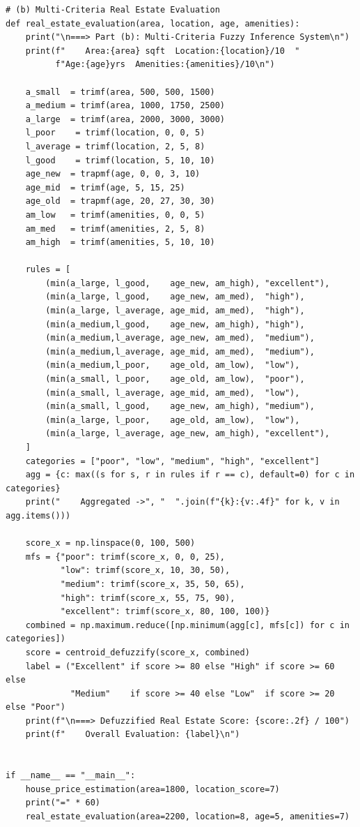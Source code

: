 \documentclass[12pt,a4paper]{article}
\begin{document}
\begin{lstlisting}
# (b) Multi-Criteria Real Estate Evaluation
def real_estate_evaluation(area, location, age, amenities):
    print("\n===> Part (b): Multi-Criteria Fuzzy Inference System\n")
    print(f"    Area:{area} sqft  Location:{location}/10  "
          f"Age:{age}yrs  Amenities:{amenities}/10\n")

    a_small  = trimf(area, 500, 500, 1500)
    a_medium = trimf(area, 1000, 1750, 2500)
    a_large  = trimf(area, 2000, 3000, 3000)
    l_poor    = trimf(location, 0, 0, 5)
    l_average = trimf(location, 2, 5, 8)
    l_good    = trimf(location, 5, 10, 10)
    age_new  = trapmf(age, 0, 0, 3, 10)
    age_mid  = trimf(age, 5, 15, 25)
    age_old  = trapmf(age, 20, 27, 30, 30)
    am_low   = trimf(amenities, 0, 0, 5)
    am_med   = trimf(amenities, 2, 5, 8)
    am_high  = trimf(amenities, 5, 10, 10)

    rules = [
        (min(a_large, l_good,    age_new, am_high), "excellent"),
        (min(a_large, l_good,    age_new, am_med),  "high"),
        (min(a_large, l_average, age_mid, am_med),  "high"),
        (min(a_medium,l_good,    age_new, am_high), "high"),
        (min(a_medium,l_average, age_new, am_med),  "medium"),
        (min(a_medium,l_average, age_mid, am_med),  "medium"),
        (min(a_medium,l_poor,    age_old, am_low),  "low"),
        (min(a_small, l_poor,    age_old, am_low),  "poor"),
        (min(a_small, l_average, age_mid, am_med),  "low"),
        (min(a_small, l_good,    age_new, am_high), "medium"),
        (min(a_large, l_poor,    age_old, am_low),  "low"),
        (min(a_large, l_average, age_new, am_high), "excellent"),
    ]
    categories = ["poor", "low", "medium", "high", "excellent"]
    agg = {c: max((s for s, r in rules if r == c), default=0) for c in categories}
    print("    Aggregated ->", "  ".join(f"{k}:{v:.4f}" for k, v in agg.items()))

    score_x = np.linspace(0, 100, 500)
    mfs = {"poor": trimf(score_x, 0, 0, 25),
           "low": trimf(score_x, 10, 30, 50),
           "medium": trimf(score_x, 35, 50, 65),
           "high": trimf(score_x, 55, 75, 90),
           "excellent": trimf(score_x, 80, 100, 100)}
    combined = np.maximum.reduce([np.minimum(agg[c], mfs[c]) for c in categories])
    score = centroid_defuzzify(score_x, combined)
    label = ("Excellent" if score >= 80 else "High" if score >= 60 else
             "Medium"    if score >= 40 else "Low"  if score >= 20 else "Poor")
    print(f"\n===> Defuzzified Real Estate Score: {score:.2f} / 100")
    print(f"    Overall Evaluation: {label}\n")


if __name__ == "__main__":
    house_price_estimation(area=1800, location_score=7)
    print("=" * 60)
    real_estate_evaluation(area=2200, location=8, age=5, amenities=7)
\end{lstlisting}
\end{document}
